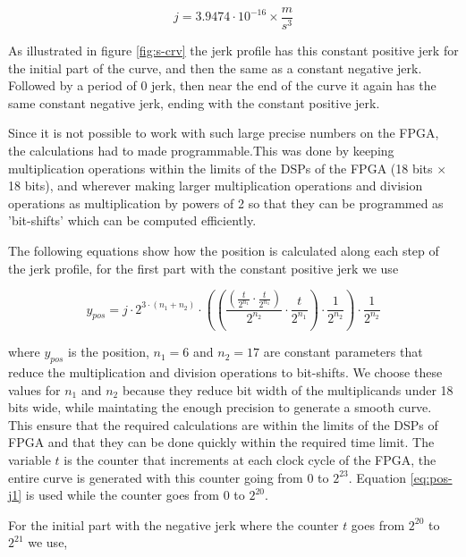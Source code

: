 \documentclass[12pt, twoside]{report}
\begin{document}
\begin{equation}
    j = 3.9474 \cdot 10^{-16} \times \frac{m}{s^3}
\end{equation}

As illustrated in figure \ref{fig:s-crv} the jerk profile has this constant positive jerk for the initial part of the curve, and then the same as a constant negative jerk. Followed by a period of 0 jerk, then near the end of the curve it again has the same constant negative jerk, ending with the constant positive jerk. 

\vspace{1em}
Since it is not possible to work with such large precise numbers on the FPGA, the calculations had to made programmable.This was done by keeping multiplication operations within the limits of the DSPs of the FPGA (18 bits $\times$ 18 bits), and wherever making larger multiplication operations and division operations as multiplication by powers of 2 so that they can be programmed as 'bit-shifts' which can be computed efficiently. 

\vspace{1em}
The following equations show how the position is calculated along each step of the jerk profile, for the first part with the constant positive jerk we use

\begin{equation}
y_{p o s}=j \cdot 2^{3 \cdot\left(n_1+n_2\right)} \cdot\left(\left(\frac{\left(\frac{t}{2^{n_1}} \cdot \frac{t}{2^{n_1}}\right)}{2^{n_2}} \cdot \frac{t}{2^{n_1}}\right) \cdot \frac{1}{2^{n_2}} \right) \cdot \frac{1}{2^{n_2}}
\label{eq:pos-j1}
\end{equation}

\vspace{0.5em}
where $y_{pos}$ is the position, $n_1 = 6$ and $n_2 = 17$ are constant parameters that reduce the multiplication and division operations to bit-shifts. We choose these values for $n_1$ and $n_2$ because they reduce bit width of the multiplicands under 18 bits wide, while maintating the enough precision to generate a smooth curve. This ensure that the required calculations are within the limits of the DSPs of FPGA and that they can be done quickly within the required time limit. The variable $t$ is the counter that increments at each clock cycle of the FPGA, the entire curve is generated with this counter going from 0 to $2^{23}$. Equation \ref{eq:pos-j1} is used while the counter goes from 0 to $2^{20}$.

\vspace{1em}
For the initial part with the negative jerk where the counter $t$ goes from $2^{20}$ to $2^{21}$ we use,
\end{document}
